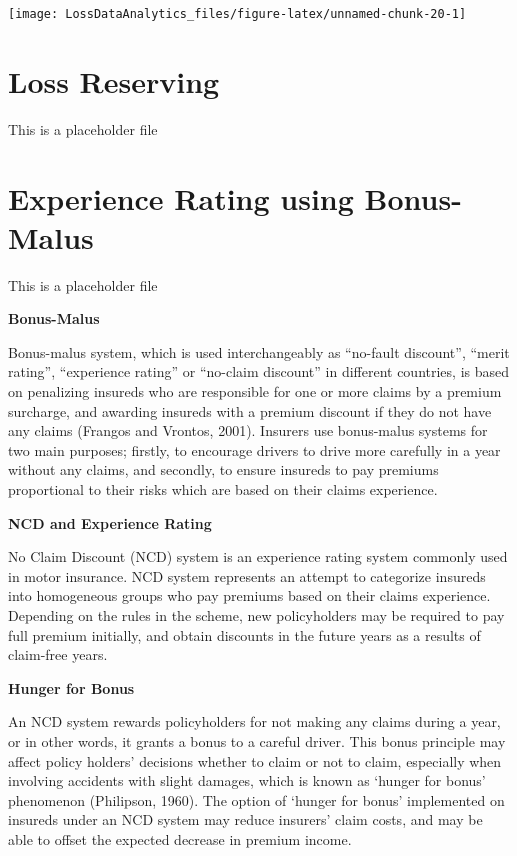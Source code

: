 \documentclass[]{book}
\theoremstyle{definition}
\theoremstyle{definition}
\theoremstyle{definition}
\theoremstyle{remark}
\begin{document}
\begin{center}\texttt{[image: LossDataAnalytics\_files/figure-latex/unnamed-chunk-20-1]} \end{center}

\chapter{Loss Reserving}\label{C:LossReserves}

This is a placeholder file

\chapter{Experience Rating using Bonus-Malus}\label{C:BonusMalus}

This is a placeholder file

\textbf{Bonus-Malus}

Bonus-malus system, which is used interchangeably as ``no-fault
discount'', ``merit rating'', ``experience rating'' or ``no-claim
discount'' in different countries, is based on penalizing insureds who
are responsible for one or more claims by a premium surcharge, and
awarding insureds with a premium discount if they do not have any claims
(Frangos and Vrontos, 2001). Insurers use bonus-malus systems for two
main purposes; firstly, to encourage drivers to drive more carefully in
a year without any claims, and secondly, to ensure insureds to pay
premiums proportional to their risks which are based on their claims
experience.

\textbf{NCD and Experience Rating}

No Claim Discount (NCD) system is an experience rating system commonly
used in motor insurance. NCD system represents an attempt to categorize
insureds into homogeneous groups who pay premiums based on their claims
experience. Depending on the rules in the scheme, new policyholders may
be required to pay full premium initially, and obtain discounts in the
future years as a results of claim-free years.

\textbf{Hunger for Bonus }

An NCD system rewards policyholders for not making any claims during a
year, or in other words, it grants a bonus to a careful driver. This
bonus principle may affect policy holders' decisions whether to claim or
not to claim, especially when involving accidents with slight damages,
which is known as `hunger for bonus' phenomenon (Philipson, 1960). The
option of `hunger for bonus' implemented on insureds under an NCD system
may reduce insurers' claim costs, and may be able to offset the expected
decrease in premium income.
\end{document}
